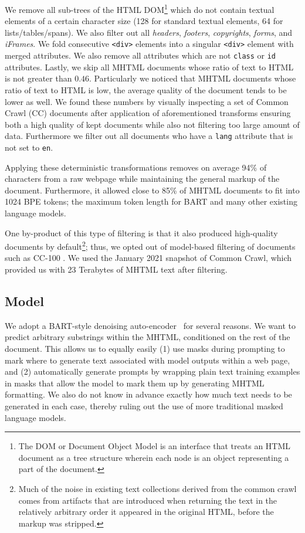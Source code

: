 \documentclass[11pt,a4paper]{article}
\begin{document}
We remove all sub-trees of the HTML DOM\footnote{The DOM or Document Object Model is an interface that treats an HTML document as a tree structure wherein each node is an object representing a part of the document.} which do not contain textual elements of a certain character size (128 for standard textual elements, 64 for lists/tables/spans). 
We also filter out all \textit{headers}, \textit{footers}, \textit{copyrights}, \textit{forms}, and \textit{iFrames}. We fold consecutive \verb+<div>+ elements into a singular \verb+<div>+ element with merged attributes. We also remove all attributes which are not \verb+class+ or \verb+id+ attributes. Lastly, we skip all MHTML documents whose ratio of text to HTML is not greater than $0.46$. Particularly we noticed that MHTML documents whose ratio of text to HTML is low, the average quality of the document tends to be lower as well. We found these numbers by visually inspecting a set of Common Crawl (CC) documents after application of aforementioned transforms ensuring both a high quality of kept documents while also not filtering too large amount of data. Furthermore we filter out all documents who have a \verb+lang+ attribute that is not set to \verb+en+.

Applying these deterministic transformations removes on average 94\% of characters from a raw webpage while maintaining the general markup of the document. Furthermore, it allowed close to 85\% of MHTML documents to fit into 1024 BPE tokens; the maximum token length for BART and many other existing language models.

One by-product of this type of filtering is that it also produced high-quality documents by default\footnote{Much of the noise in existing text collections derived from the common crawl comes from artifacts that are introduced when returning the text in the relatively arbitrary order it appeared in the original HTML, before the markup was stripped.}; thus, we opted out of model-based filtering of documents such as CC-100 \citep{XLMR}. We used the January 2021 snapshot of Common Crawl, which provided us with 23 Terabytes of MHTML text after filtering.

\subsection{Model}
\label{sec:model}

We adopt a BART-style denoising auto-encoder~\citep{BART} for several reasons. We want to predict arbitrary substrings within the MHTML, conditioned on the rest of the document. This allows us to equally easily (1) use masks during prompting to mark where to generate text associated with model outputs within a web page, and (2) automatically generate prompts by wrapping plain text training examples in masks that allow the model to mark them up by generating MHTML formatting.  We also do not know in advance exactly how much text needs to be generated in each case, thereby ruling out the use of more traditional masked language models. 
\end{document}
